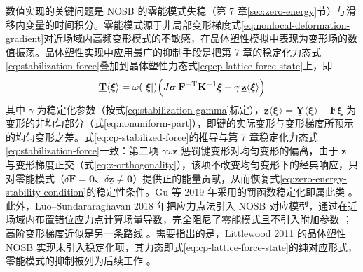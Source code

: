 数值实现的关键问题是 NOSB 的零能模式失稳（第 7 章\ref{sec:zero-energy}节）与滑移内变量的时间积分。零能模式源于非局部变形梯度式\eqref{eq:nonlocal-deformation-gradient}对近场域内高频变形模式的不敏感，在晶体塑性模拟中表现为变形场的数值振荡。晶体塑性实现中应用最广的抑制手段是把第 7 章的稳定化力态式\eqref{eq:stabilization-force}叠加到晶体塑性力态式\eqref{eq:cp-lattice-force-state}上，即
\begin{equation}
  \underline{\mathbf{T}}\langle\boldsymbol{\xi}\rangle
  =\omega(|\boldsymbol{\xi}|)\Bigl(J\boldsymbol{\sigma}\,\mathbf{F}^{-\mathrm{T}}\mathbf{K}^{-1}\boldsymbol{\xi}
  +\gamma\,\underline{\mathbf{z}}\langle\boldsymbol{\xi}\rangle\Bigr)
  \label{eq:cp-stabilized-force}
\end{equation}
其中 $\gamma$ 为稳定化参数（按式\eqref{eq:stabilization-gamma}标定），$\underline{\mathbf{z}}\langle\boldsymbol{\xi}\rangle=\underline{\mathbf{Y}}\langle\boldsymbol{\xi}\rangle-\mathbf{F}\boldsymbol{\xi}$ 为变形的非均匀部分（式\eqref{eq:nonuniform-part}），即键的实际变形与变形梯度所预示的均匀变形之差。式\eqref{eq:cp-stabilized-force}的推导与第 7 章稳定化力态式\eqref{eq:stabilization-force}一致：第二项 $\gamma\omega\underline{\mathbf{z}}$ 惩罚键变形对均匀变形的偏离，由于 $\underline{\mathbf{z}}$ 与变形梯度正交（式\eqref{eq:z-orthogonality}），该项不改变均匀变形下的经典响应，只对零能模式（$\delta\mathbf{F}=\mathbf{0}$、$\delta\underline{\mathbf{z}}\neq\mathbf{0}$）提供正的能量贡献，从而恢复式\eqref{eq:zero-energy-stability-condition}的稳定性条件。Gu 等 2019 年采用的罚函数稳定化即属此类 \cite{GuZhangMadenci2019}。此外，Luo--Sundararaghavan 2018 年把应力点法引入 NOSB 对应模型，通过在近场域内布置错位应力点计算场量导数，完全阻尼了零能模式且不引入附加参数 \cite{LuoSundararaghavan2018}；高阶变形梯度近似是另一条路线 \cite{YaghoobiChorzepa2017}。需要指出的是，Littlewood 2011 的晶体塑性 NOSB 实现未引入稳定化项，其力态即式\eqref{eq:cp-lattice-force-state}的纯对应形式，零能模式的抑制被列为后续工作 \cite{Littlewood2011}。

